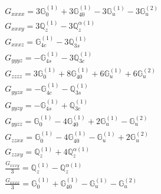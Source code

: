 \documentclass[fleqn,8pt,landscape]{jsarticle}
\begin{document}
\begin{align*}
& G_{xxxx} = 3 \mathbb{G}_{0}^{(1)} + 3 \mathbb{G}_{40}^{(1)} - 3 \mathbb{G}_{u}^{(1)} - 3 \mathbb{G}_{u}^{(2)} \\
& G_{xxxy} = 3 \mathbb{Q}_{z}^{(1)} - 3 \mathbb{Q}_{z}^{\alpha(1)} \\
& G_{xxxz} = \mathbb{G}_{4c}^{(1)} - 3 \mathbb{Q}_{3s}^{(1)} \\
& G_{yyyz} = - \mathbb{G}_{4s}^{(1)} - 3 \mathbb{Q}_{3c}^{(1)} \\
& G_{zzzz} = 3 \mathbb{G}_{0}^{(1)} + 8 \mathbb{G}_{40}^{(1)} + 6 \mathbb{G}_{u}^{(1)} + 6 \mathbb{G}_{u}^{(2)} \\
& G_{yyzx} = - \mathbb{G}_{4c}^{(1)} - \mathbb{Q}_{3s}^{(1)} \\
& G_{yyzy} = - \mathbb{G}_{4s}^{(1)} + \mathbb{Q}_{3c}^{(1)} \\
& G_{yyzz} = \mathbb{G}_{0}^{(1)} - 4 \mathbb{G}_{40}^{(1)} + 2 \mathbb{G}_{u}^{(1)} - \mathbb{G}_{u}^{(2)} \\
& G_{zzxx} = \mathbb{G}_{0}^{(1)} - 4 \mathbb{G}_{40}^{(1)} - \mathbb{G}_{u}^{(1)} + 2 \mathbb{G}_{u}^{(2)} \\
& G_{zzxy} = \mathbb{Q}_{z}^{(1)} + 4 \mathbb{Q}_{z}^{\alpha(1)} \\
& \frac{G_{xxxy}}{3} = \mathbb{Q}_{z}^{(1)} - \mathbb{Q}_{z}^{\alpha(1)} \\
& \frac{G_{xxxx}}{3} = \mathbb{G}_{0}^{(1)} + \mathbb{G}_{40}^{(1)} - \mathbb{G}_{u}^{(1)} - \mathbb{G}_{u}^{(2)}
\end{align*}
\end{document}
